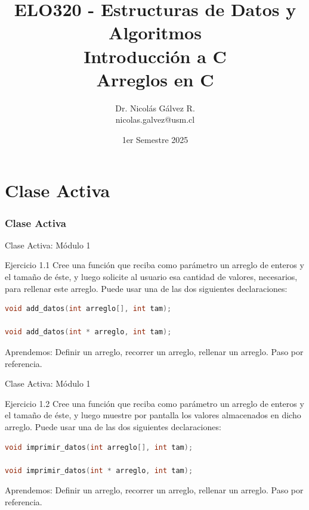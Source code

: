 \documentclass{beamer}
\title{ELO320 - Estructuras de Datos y Algoritmos\\Introducción a C\\Arreglos en C}
\author{Dr. Nicolás Gálvez R.\\{\small nicolas.galvez@usm.cl}}
\institute{Ing. Civil Telemática - Departamento de Electrónica}
\date{1er Semestre 2025}
\begin{document}
\frame{\titlepage}

%


\part{Clase Activa}
\section{Clase Activa}
\begin{frame}[fragile]{Clase Activa: Módulo 1}
\begin{exampleblock}{Ejercicio 1.1}
Cree una función que reciba como parámetro un arreglo de enteros y el tamaño de éste, y luego solicite al usuario esa cantidad de valores, necesarios, para rellenar este arreglo. Puede usar una de las dos siguientes declaraciones:
\begin{lstlisting}[language=C, basicstyle=\scriptsize]
void add_datos(int arreglo[], int tam);

void add_datos(int * arreglo, int tam);
\end{lstlisting}
\end{exampleblock}

{\tiny Aprendemos: Definir un arreglo, recorrer un arreglo, rellenar un arreglo. Paso por referencia.}
\end{frame}

\begin{frame}[fragile]{Clase Activa: Módulo 1}
\begin{exampleblock}{Ejercicio 1.2}
Cree una función que reciba como parámetro un arreglo de enteros y el tamaño de éste, y luego muestre por pantalla los valores almacenados en dicho arreglo. Puede usar una de las dos siguientes declaraciones:
\begin{lstlisting}[language=C, basicstyle=\scriptsize]
void imprimir_datos(int arreglo[], int tam);

void imprimir_datos(int * arreglo, int tam);
\end{lstlisting}
\end{exampleblock}

{\tiny Aprendemos: Definir un arreglo, recorrer un arreglo, rellenar un arreglo. Paso por referencia.}
\end{frame}
\end{document}
